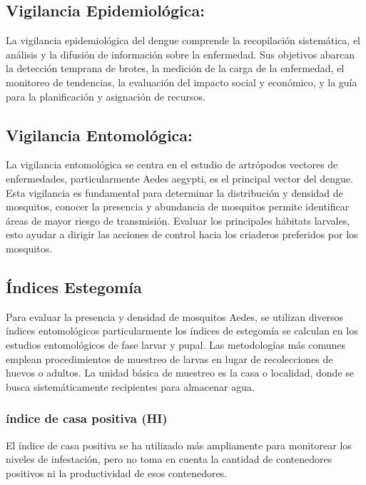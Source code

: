 \documentclass[
  letterpaper,
]{scrbook}
\begin{document}
\subsection{Vigilancia
Epidemiológica:}\label{vigilancia-epidemioluxf3gica}

La vigilancia epidemiológica del dengue comprende la recopilación
sistemática, el análisis y la difusión de información sobre la
enfermedad. Sus objetivos abarcan la detección temprana de brotes, la
medición de la carga de la enfermedad, el monitoreo de tendencias, la
evaluación del impacto social y económico, y la guía para la
planificación y asignación de recursos.

\subsection{Vigilancia Entomológica:}\label{vigilancia-entomoluxf3gica}

La vigilancia entomológica se centra en el estudio de artrópodos
vectores de enfermedades, particularmente Aedes aegypti, es el principal
vector del dengue. Esta vigilancia es fundamental para determinar la
distribución y densidad de mosquitos, conocer la presencia y abundancia
de mosquitos permite identificar áreas de mayor riesgo de transmisión.
Evaluar los principales hábitats larvales, esto ayudar a dirigir las
acciones de control hacia los criaderos preferidos por los mosquitos.

\subsection{Índices Estegomía}\label{uxedndices-estegomuxeda}

Para evaluar la presencia y densidad de mosquitos Aedes, se utilizan
diversos índices entomológicos particularmente los índices de estegomía
se calculan en los estudios entomológicos de fase larvar y pupal. Las
metodologías más comunes emplean procedimientos de muestreo de larvas en
lugar de recolecciones de huevos o adultos. La unidad básica de muestreo
es la casa o localidad, donde se busca sistemáticamente recipientes para
almacenar agua.

\subsubsection{índice de casa positiva
(HI)}\label{uxedndice-de-casa-positiva-hi}

El índice de casa positiva se ha utilizado más ampliamente para
monitorear los niveles de infestación, pero no toma en cuenta la
cantidad de contenedores positivos ni la productividad de esos
contenedores.
\end{document}
